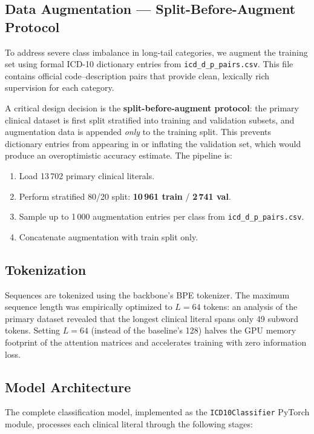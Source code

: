 \documentclass[10pt,a4paper,twocolumn]{article}
\begin{document}
\subsection{Data Augmentation --- Split-Before-Augment Protocol}

To address severe class imbalance in long-tail categories, we augment the
training set using formal ICD-10 dictionary entries from
\texttt{icd\_d\_p\_pairs.csv}. This file contains official code--description
pairs that provide clean, lexically rich supervision for each category.

A critical design decision is the \textbf{split-before-augment protocol}: the
primary clinical dataset is first split stratified into training and validation
subsets, and augmentation data is appended \emph{only} to the training split.
This prevents dictionary entries from appearing in or inflating the validation set,
which would produce an overoptimistic accuracy estimate. The pipeline is:

\begin{enumerate}
  \item Load 13\,702 primary clinical literals.
  \item Perform stratified 80/20 split: \textbf{10\,961 train} / \textbf{2\,741 val}.
  \item Sample up to 1\,000 augmentation entries per class from
        \texttt{icd\_d\_p\_pairs.csv}.
  \item Concatenate augmentation with train split only.
\end{enumerate}

\subsection{Tokenization}

Sequences are tokenized using the backbone's BPE tokenizer. The maximum sequence
length was empirically optimized to $L = 64$ tokens: an analysis of the primary
dataset revealed that the longest clinical literal spans only 49 subword tokens.
Setting $L = 64$ (instead of the baseline's 128) halves the GPU memory footprint
of the attention matrices and accelerates training with zero information loss.

\subsection{Model Architecture}

The complete classification model, implemented as the \texttt{ICD10Classifier}
PyTorch module, processes each clinical literal through the following stages:
\end{document}
